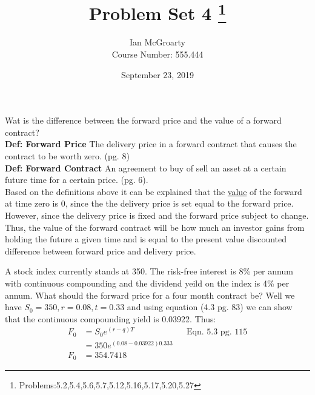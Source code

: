 \documentclass[12pt]{article}
\title{Problem Set 4 \thanks{Problems:5.2,5.4,5.6,5.7,5.12,5.16,5.17,5.20,5.27}}
\author{Ian McGroarty \\
	Course Number: 555.444}
\date{September 23, 2019}
\newenvironment{problem}[3][Problem]{\begin{trivlist}
\item[\hskip \labelsep {\bfseries #1}\hskip \labelsep {\bfseries #2.}]}{\end{trivlist}}
\begin{document}
\maketitle
\newpage
\begin{problem}{5.2}. Wat is the difference between the forward price and the value of a forward contract?  \\
	\textbf{Def: Forward Price} The delivery price in a forward contract that causes the contract to be worth zero. (pg. 8)\\
	\textbf{Def: Forward Contract} An agreement to buy of sell an asset at a certain future time for a certain price. (pg. 6). \\
Based on the definitions above it can be explained that the \underline{value} of the forward at time zero is 0, since the the delivery price is set equal to the forward price. However, since the delivery price is fixed and the forward price subject to change. Thus, the value of the forward contract will be how much an investor gains from holding the future a given time and is equal to the present value discounted difference between  forward price and delivery price. 
\end{problem}

\begin{problem}{5.4}. A stock index currently stands at 350. The risk-free interest is 8\% per annum with continuous compounding and the dividend yeild on the index is 4\% per annum. What should the forward price for a four month contract be? Well we have $S_0=350, r=0.08, t= 0.33$ and using equation (4.3 pg. 83) we can show that the continuous compounding yield is 0.03922. Thus: 
\begin{align*}
F_0 &= S_0e^{(r-q)T} && \text{Eqn. 5.3 pg. 115} \\
&= 350e^{(0.08-0.03922)0.333} \\
F_0 &= 354.7418
\end{align*}
\end{problem} 
\end{document}
